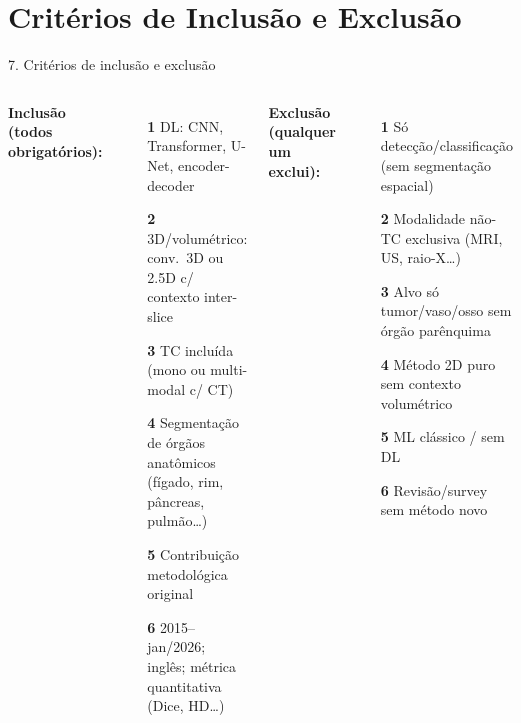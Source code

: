 \documentclass[aspectratio=169]{beamer}
\begin{document}
\section{Critérios de Inclusão e Exclusão}
\begin{frame}{7. Critérios de inclusão e exclusão}
\scriptsize
\begin{columns}[T]
\textbf{Inclusão (todos obrigatórios):}
\begin{itemize}
	\item[\textbf{1}] DL: CNN, Transformer, U-Net, encoder-decoder
	\item[\textbf{2}] 3D/volumétrico: conv.\ 3D ou 2.5D c/ contexto inter-slice
	\item[\textbf{3}] TC incluída (mono ou multi-modal c/ CT)
	\item[\textbf{4}] Segmentação de órgãos anatômicos (fígado, rim, pâncreas, pulmão\ldots)
	\item[\textbf{5}] Contribuição metodológica original
	\item[\textbf{6}] 2015--jan/2026; inglês; métrica quantitativa (Dice, HD\ldots)
\end{itemize}

\textbf{Exclusão (qualquer um exclui):}
\begin{itemize}
	\item[\textbf{1}] Só detecção/classificação (sem segmentação espacial)
	\item[\textbf{2}] Modalidade não-TC exclusiva (MRI, US, raio-X\ldots)
	\item[\textbf{3}] Alvo só tumor/vaso/osso sem órgão parênquima
	\item[\textbf{4}] Método 2D puro sem contexto volumétrico
	\item[\textbf{5}] ML clássico / sem DL
	\item[\textbf{6}] Revisão/survey sem método novo
\end{itemize}
\end{columns}
\end{frame}
\end{document}
